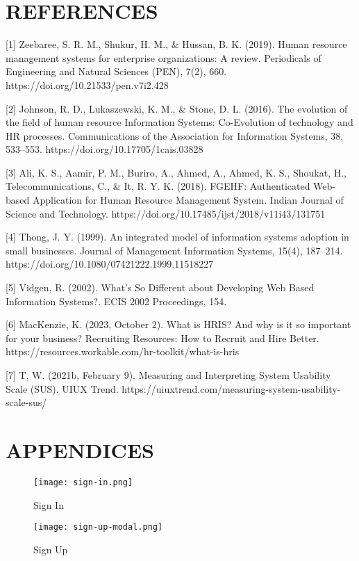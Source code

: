 \documentclass[journal]{./IEEE/IEEEtran}
\begin{document}
\section{\textbf{REFERENCES}}
[1] Zeebaree, S. R. M., Shukur, H. M., & Hussan, B. K. (2019). Human resource management systems for enterprise organizations: A review. Periodicals of Engineering and Natural Sciences (PEN), 7(2), 660. https://doi.org/10.21533/pen.v7i2.428

[2] Johnson, R. D., Lukaszewski, K. M., & Stone, D. L. (2016). The evolution of the field of human resource Information Systems: Co-Evolution of technology and HR processes. Communications of the Association for Information Systems, 38, 533–553. https://doi.org/10.17705/1cais.03828

[3] Ali, K. S., Aamir, P. M., Buriro, A., Ahmed, A., Ahmed, K. S., Shoukat, H., Telecommunications, C., & It, R. Y. K. (2018). FGEHF: Authenticated Web-based Application for Human Resource Management System. Indian Journal of Science and Technology. https://doi.org/10.17485/ijst/2018/v11i43/131751

[4] Thong, J. Y. (1999). An integrated model of information systems adoption in small businesses. Journal of Management Information Systems, 15(4), 187–214. https://doi.org/10.1080/07421222.1999.11518227

[5] Vidgen, R. (2002). What's So Different about Developing Web Based Information Systems?. ECIS 2002 Proceedings, 154.

[6] MacKenzie, K. (2023, October 2). What is HRIS? And why is it so important for your business? Recruiting Resources: How to Recruit and Hire Better. https://resources.workable.com/hr-toolkit/what-is-hris

[7] T, W. (2021b, February 9). Measuring and Interpreting System Usability Scale (SUS). UIUX Trend. https://uiuxtrend.com/measuring-system-usability-scale-sus/

\clearpage
\section{\textbf{APPENDICES}}
\begin{figure}[H]
    \centering
    \texttt{[image: sign-in.png]}
    \caption{Sign In}

\end{figure}

\begin{figure}[H]
    \centering
    \texttt{[image: sign-up-modal.png]}
        \caption{Sign Up}

\end{figure}
\end{document}
